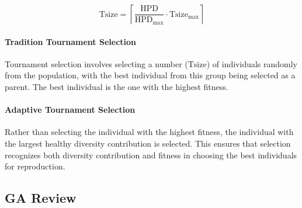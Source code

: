 \documentclass[../main.tex]{subfiles}
\begin{document}
\begin{equation}
\text{Tsize} = \left\lceil \frac{\text{HPD}}{\text{HPD}_\text{max}} \cdot \text{Tsize}_\text{max} \right\rceil
\end{equation}

\paragraph{Tradition Tournament Selection}

Tournament selection involves selecting a number ($\text{Tsize}$) of individuals randomly from the population, with the
best individual from this group being selected as a parent. The best individual is the one with the highest fitness.

\paragraph{Adaptive Tournament Selection} Rather than selecting the individual with the highest fitness, the individual
with the largest healthy diversity contribution is selected. This ensures that selection recognizes both diversity
contribution and fitness in choosing the best individuals for reproduction.

\subsection{GA Review}
\end{document}
